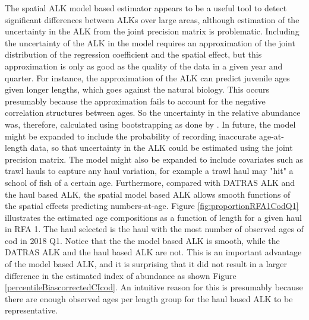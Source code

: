 \documentclass[a4paper 12pt]{article}
\numberwithin{equation}{section}
\begin{document}
The spatial ALK model based estimator appears to be a useful tool to detect significant differences between ALKs over large areas, although estimation of the uncertainty in the ALK from the joint precision matrix is problematic. Including the uncertainty of the ALK in the model requires an approximation of the joint distribution of the regression coefficient and the spatial effect, but this approximation is only as good as the quality of the data in a given year and quarter. For instance, the approximation of the ALK can predict juvenile ages given longer lengths, which goes against the natural biology. This occurs presumably because the approximation fails to account for the negative correlation structures between ages. So the uncertainty in the relative abundance was, therefore, calculated using bootstrapping as done by \citet{berg2012spatial,berg2014evaluation}. In future, the model might be expanded to include the probability of recording inaccurate age-at-length data, so that uncertainty in the ALK could be estimated using the joint precision matrix. The model might also be expanded to include covariates such as trawl hauls to capture any haul variation, for example a trawl haul may "hit" a school of fish  of a certain age. Furthermore, compared with DATRAS ALK and the haul based ALK, the spatial model based ALK allows smooth functions of the spatial effects predicting numbers-at-age. Figure \ref{fig:proportionRFA1CodQ1} illustrates the estimated age compositions as a function of length for a given haul in RFA 1. The haul selected is the haul with the most number of observed ages of cod in 2018 Q1. Notice that the the model based ALK is smooth, while the DATRAS ALK and the haul based ALK are not. This is an important advantage of the model based ALK, and it is surprising that it did not result in a larger difference in the estimated index of abundance as shown Figure \ref{percentileBiascorrectedCIcod}. An intuitive reason for this is presumably because there are enough observed ages per length group for the haul based ALK to be representative.
\end{document}
